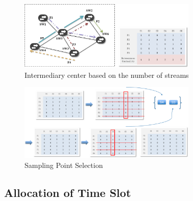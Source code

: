 \documentclass[conference,compsoc]{IEEEtran}
\begin{document}
\begin{figure}[!hhhhhhhhhht]
\centering
\includegraphics[width=8.5cm]{images/png_sampling_point.png}
\caption{Intermediary center based on the number of streams}
\label{png_sampling_point.png}
\end{figure}

\begin{figure}[!hhhhhhhhhht]
\centering
\includegraphics[width=8.5cm]{images/png_sampling_point_in.png}
\caption{Sampling Point Selection}
\label{png_sampling_point_in.png}
\end{figure}





\subsection{Allocation of Time Slot}
\end{document}
